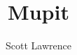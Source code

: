 \documentclass[letterpaper]{article}
\begin{document}
\title{Mupit}
\author{Scott Lawrence}
\maketitle
\end{document}
